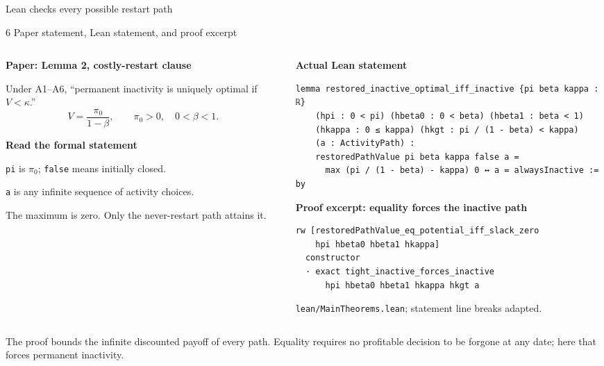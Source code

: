 \documentclass[aspectratio=169,11pt]{beamer}
\newcommand{\kwTurq}[1]{{\color{turquoise}#1}}
\newcommand{\labeltext}[1]{\par{\small\bfseries\color{blue}#1\par}\vspace{1.5mm}}
\newcommand{\takeaway}[1]{\par\vspace{2.5mm}\begingroup\setlength{\fboxsep}{2.5mm}\colorbox{pale}{\begin{minipage}{\dimexpr\linewidth-5mm\relax}\small\raggedright #1\end{minipage}}\endgroup\par}
\newcommand{\sectiontag}[1]{{\scriptsize\color{muted}#1\par}\vspace{2mm}}
\begin{document}
\begin{frame}[fragile]{Lean checks \kwTurq{every possible restart path}}
\sectiontag{6 \textperiodcentered{} Paper statement, Lean statement, and proof excerpt}
\begin{columns}[T,onlytextwidth]
\begin{column}{.35\textwidth}
\labeltext{Paper: Lemma 2, costly-restart clause}
\small Under A1--A6, ``permanent inactivity is uniquely optimal if $V<\kappa$.''
\[V=\frac{\pi_0}{1-\beta},\qquad \pi_0>0,\quad0<\beta<1.\]
\vspace{2mm}\labeltext{Read the formal statement}
\small \texttt{pi} is $\pi_0$; \texttt{false} means initially closed.\par\vspace{2mm}
\texttt{a} is any infinite sequence of activity choices.\par\vspace{2mm}
The maximum is zero. Only the never-restart path attains it.
\end{column}
\begin{column}{.62\textwidth}
\labeltext{Actual Lean statement}
\begin{lstlisting}[basicstyle=\ttfamily\fontsize{8.6}{10}\selectfont]
lemma restored_inactive_optimal_iff_inactive {pi beta kappa : ℝ}
    (hpi : 0 < pi) (hbeta0 : 0 < beta) (hbeta1 : beta < 1)
    (hkappa : 0 ≤ kappa) (hkgt : pi / (1 - beta) < kappa)
    (a : ActivityPath) :
    restoredPathValue pi beta kappa false a =
      max (pi / (1 - beta) - kappa) 0 ↔ a = alwaysInactive := by
\end{lstlisting}
\labeltext{Proof excerpt: equality forces the inactive path}
\begin{lstlisting}[basicstyle=\ttfamily\fontsize{8.6}{10}\selectfont]
  rw [restoredPathValue_eq_potential_iff_slack_zero
    hpi hbeta0 hbeta1 hkappa]
  constructor
  · exact tight_inactive_forces_inactive
      hpi hbeta0 hbeta1 hkappa hkgt a
\end{lstlisting}
{\scriptsize\color{muted}\texttt{lean/MainTheorems.lean}; statement line breaks adapted.}
\end{column}
\end{columns}
\takeaway{The proof bounds the infinite discounted payoff of every path. Equality requires no profitable decision to be forgone at any date; here that forces permanent inactivity.}
\end{frame}
\end{document}
